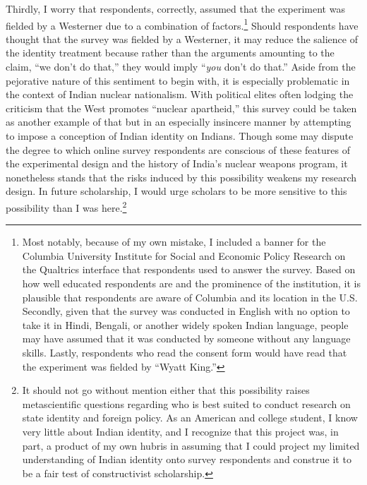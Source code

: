 \documentclass[12pt]{article}
\begin{document}
Thirdly, I worry that respondents, correctly, assumed that the experiment was fielded by a Westerner due to a combination of factors.\footnote{Most notably, because of my own mistake, I included a banner for the Columbia University Institute for Social and Economic Policy Research on the Qualtrics interface that respondents used to answer the survey. Based on how well educated respondents are and the prominence of the institution, it is plausible that respondents are aware of Columbia and its location in the U.S. Secondly, given that the survey was conducted in English with no option to take it in Hindi, Bengali, or another widely spoken Indian language, people may have assumed that it was conducted by someone without any language skills. Lastly, respondents who read the consent form would have read that the experiment was fielded by “Wyatt King.”} Should respondents have thought that the survey was fielded by a Westerner, it may reduce the salience of the identity treatment because rather than the arguments amounting to the claim, “we don't do that,” they would imply “\textit{you} don't do that.” Aside from the pejorative nature of this sentiment to begin with, it is especially problematic in the context of Indian nuclear nationalism. With political elites often lodging the criticism that the West promotes “nuclear apartheid,” this survey could be taken as another example of that but in an especially insincere manner by attempting to impose a conception of Indian identity on Indians. Though some may dispute the degree to which online survey respondents are conscious of these features of the experimental design and the history of India's nuclear weapons program, it nonetheless stands that the risks induced by this possibility weakens my research design. In future scholarship, I would urge scholars to be more sensitive to this possibility than I was here.\footnote{It should not go without mention either that this possibility raises metascientific questions regarding who is best suited to conduct research on state identity and foreign policy. As an American and college student, I know very little about Indian identity, and I recognize that this project was, in part, a product of my own hubris in assuming that I could project my limited understanding of Indian identity onto survey respondents and construe it to be a fair test of constructivist scholarship.}

\newpage



\newpage
\end{document}
